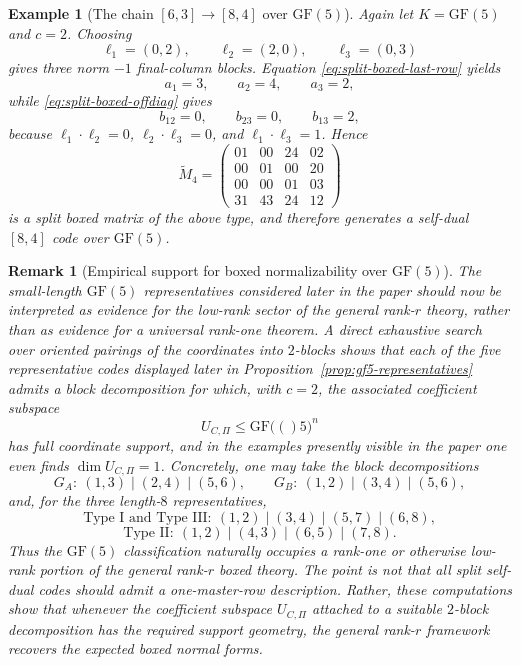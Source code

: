 \documentclass[12pt]{article}
\newtheorem{example}[theorem]{Example}
\newtheorem{remark}[theorem]{Remark}
\newcommand{\GF}[1]{\ensuremath{\mathrm{GF}(#1)}}
\begin{document}
\begin{example}[The chain \texorpdfstring{$[6,3]\to[8,4]$}{[6,3] to [8,4]} over \texorpdfstring{$\GF{5}$}{GF(5)}]
\label{ex:split-boxed-84}
Again let \(K=\GF{5}\) and \(c=2\). Choosing
\[
\ell_1=(0,2),\qquad \ell_2=(2,0),\qquad \ell_3=(0,3)
\]
gives three norm \(-1\) final-column blocks. Equation \eqref{eq:split-boxed-last-row} yields
\[
a_1=3,\qquad a_2=4,\qquad a_3=2,
\]
while \eqref{eq:split-boxed-offdiag} gives
\[
b_{12}=0,\qquad b_{23}=0,\qquad b_{13}=2,
\]
because \(\ell_1\cdot\ell_2=0\), \(\ell_2\cdot\ell_3=0\), and \(\ell_1\cdot\ell_3=1\). Hence
\[
\widetilde M_4=
\begin{pmatrix}
01 & 00 & 24 & 02\\
00 & 01 & 00 & 20\\
00 & 00 & 01 & 03\\
31 & 43 & 24 & 12
\end{pmatrix}
\]
is a split boxed matrix of the above type, and therefore generates a self-dual \([8,4]\) code over \(\GF{5}\).
\end{example}

\begin{remark}[Empirical support for boxed normalizability over \texorpdfstring{$\GF{5}$}{GF(5)}]
\label{rem:gf5-boxed-evidence}
The small-length \(\GF{5}\) representatives considered later in the paper should now be interpreted as evidence for the low-rank sector of the general rank-\(r\) theory, rather than as evidence for a universal rank-one theorem. A direct exhaustive search over oriented pairings of the coordinates into \(2\)-blocks shows that each of the five representative codes displayed later in Proposition~\ref{prop:gf5-representatives} admits a block decomposition for which, with \(c=2\), the associated coefficient subspace
\[
U_{C,\Pi}\le \GF(5)^n
\]
has full coordinate support, and in the examples presently visible in the paper one even finds \(\dim U_{C,\Pi}=1\). Concretely, one may take the block decompositions
\[
G_A:\ (1,3)\mid(2,4)\mid(5,6),\qquad
G_B:\ (1,2)\mid(3,4)\mid(5,6),
\]
and, for the three length-\(8\) representatives,
\[
\text{Type I and Type III}:\ (1,2)\mid(3,4)\mid(5,7)\mid(6,8),
\]
\[
\text{Type II}:\ (1,2)\mid(4,3)\mid(6,5)\mid(7,8).
\]
Thus the \(\GF{5}\) classification naturally occupies a rank-one or otherwise low-rank portion of the general rank-\(r\) boxed theory. The point is not that all split self-dual codes should admit a one-master-row description. Rather, these computations show that whenever the coefficient subspace \(U_{C,\Pi}\) attached to a suitable \(2\)-block decomposition has the required support geometry, the general rank-\(r\) framework recovers the expected boxed normal forms.
\end{remark}
\end{document}
